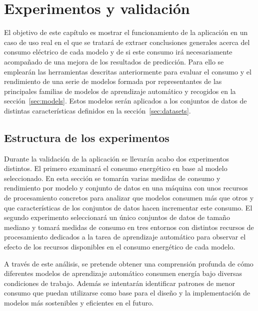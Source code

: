\chapter{Experimentos y validación}
\label{chap:experimentos}

El objetivo de este capítulo es mostrar el funcionamiento de la aplicación en un caso de uso real en el que se tratará de extraer conclusiones generales acerca del consumo eléctrico de cada modelo y de si este consumo irá necesariamente acompañado de una mejora de los resultados de predicción.
Para ello se emplearán las herramientas descritas anteriormente para evaluar el consumo y el rendimiento de una serie de modelos formada por representantes de las principales familias de modelos de aprendizaje automático y recogidos en la sección~\ref{sec:models}. Estos modelos serán aplicados a los conjuntos de datos de distintas características definidos en la sección~\ref{sec:datasets}.

\section{Estructura de los experimentos}

Durante la validación de la aplicación se llevarán acabo dos experimentos distintos.
El primero examinará el consumo energético en base al modelo seleccionado. En esta sección se tomarán varias medidas de consumo y rendimiento por modelo y conjunto de datos en una máquina con unos recursos de procesamiento concretos para analizar que modelos consumen más que otros y que características de los conjuntos de datos hacen incrementar este consumo.
El segundo experimento seleccionará un único conjuntos de datos de tamaño mediano y tomará medidas de consumo en tres entornos con distintos recursos de procesamiento dedicados a la tarea de aprendizaje automático para observar el efecto de los recursos disponibles en el consumo energético de cada modelo.

A través de este análisis, se pretende obtener una comprensión profunda de cómo diferentes modelos de aprendizaje automático consumen energía bajo diversas condiciones de trabajo. Además se intentarán identificar patrones de menor consumo que puedan utilizarse como base para el diseño y la implementación de modelos más sostenibles y eficientes en el futuro.




